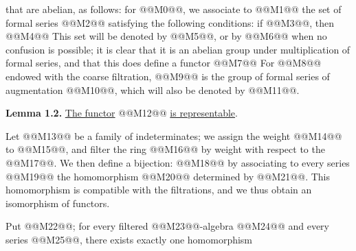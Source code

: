 that are abelian, as follows: for @@M0@@, we associate to @@M1@@ the set of formal series @@M2@@ satisfying the following conditions: if @@M3@@, then
@@M4@@
This set will be denoted by @@M5@@, or by @@M6@@ when no confusion is possible; it is clear that it is an abelian group under multiplication of formal series, and that this does define a functor
@@M7@@
For @@M8@@ endowed with the coarse filtration, @@M9@@ is the group of formal series of augmentation @@M10@@, which will also be denoted by @@M11@@.

\textbf{Lemma 1.2.} \uline{The functor} @@M12@@ \uline{is representable}.

Let @@M13@@ be a family of indeterminates; we assign the weight @@M14@@ to @@M15@@, and filter the ring @@M16@@ by weight with respect to the @@M17@@. We then define a bijection:
@@M18@@
by associating to every series @@M19@@ the homomorphism @@M20@@ determined by @@M21@@. This homomorphism is compatible with the filtrations, and we thus obtain an isomorphism of functors.

Put @@M22@@; for every filtered @@M23@@-algebra @@M24@@ and every series @@M25@@, there exists exactly one homomorphism
